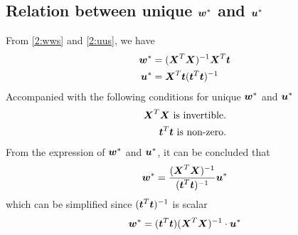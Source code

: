 \documentclass[11pt,a4paper]{article}
\newcommand{\htab}{\hspace*{0.63cm}}
\begin{document}
\subsection{Relation between unique $\wws$ and $\uus$}
\htab From \eqref{2:wws} and \eqref{2:uus}, we have
    \begin{align}
        \wws &= (\XXt \XX)^{-1} \XXt \TT  \label{2:wwss}\\
        \uus &= \XXt \TT (\TT^{T} \TT)^{-1}  \label{2:uuss}
    \end{align}
\htab Accompanied with the following conditions for unique $\wws$ and $\uus$
\begin{align}
    \text{$\XXt \XX$ is invertible.} \\
    \text{$\TTt \TT$ is non-zero.}
    \end{align}
\htab From the expression of $\wws$ and $\uus$, it can be concluded that 
\begin{align}
    \wws = \frac{(\XXt \XX)^{-1}}{(\TTt \TT)^{-1}}\uus 
    \end{align}
\htab which can be simplified since $(\TTt \TT)^{-1}$ is scalar
\begin{align}
    \wws = (\TTt \TT) (\XXt \XX)^{-1} \cdot \uus 
    \end{align}
\newpage
\end{document}

